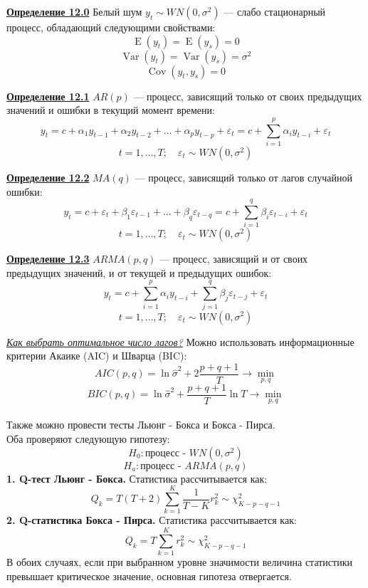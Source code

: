 \documentclass[a0,final]{a0poster}
\DeclareMathOperator{\Var}{Var}
\DeclareMathOperator{\Cov}{Cov}
\DeclareMathOperator{\E}{E}
\begin{document}
\begin{multicols}{4}
\begin{tcolorbox}[colback=green!5!white,colframe=green!75!black]
\textbf{\underline{Определение 12.0}} Белый шум $y_t \sim WN(0, \sigma^2)$ — слабо стационарный процесс, обладающий следующими свойствами:
\[\E(y_t)=\E(y_s)=0\]
\[\Var(y_t) = \Var(y_s) = \sigma^2 \]
\[\Cov(y_t,y_s) = 0\]
\end{tcolorbox}

\begin{tcolorbox}[colback=red!5!white,colframe=red!75!black]
\textbf{\underline{Определение 12.1}} $AR(p)$ — процесс, зависящий только от своих предыдущих значений и ошибки в текущий момент времени: \[y_t = c + \alpha_1y_{t-1} + \alpha_2y_{t-2}+ \ldots +\alpha_py_{t-p} + \varepsilon_t = c + \sum\limits_{i=1}^p \alpha_iy_{t-i} + \varepsilon_t\]
\[t=1, \ldots,T; \quad \varepsilon_t \sim WN(0, \sigma^2)\]
\end{tcolorbox}

\begin{tcolorbox}[colback=red!5!white,colframe=red!75!black]
\textbf{\underline{Определение 12.2}} $MA(q)$ — процесс, зависящий только от лагов случайной ошибки: \[y_t = c +  \varepsilon_t + \beta_1\varepsilon_{t-1}+ \ldots +\beta_q\varepsilon_{t-q}= c + \sum\limits_{i=1}^q \beta_i\varepsilon_{t-i} + \varepsilon_t\]
\[t=1, \ldots,T; \quad \varepsilon_t \sim WN(0, \sigma^2)\]
\end{tcolorbox}

\begin{tcolorbox}[colback=red!5!white,colframe=red!75!black]
\textbf{\underline{Определение 12.3}} $ARMA(p,q)$ — процесс, зависящий и от своих предыдущих значений, и от текущей и предыдущих ошибок: \[y_t = c +  \sum\limits_{i=1}^p \alpha_iy_{t-i} + \sum\limits_{j=1}^q \beta_j\varepsilon_{t-j} + \varepsilon_t\]
\[t=1, \ldots,T; \quad \varepsilon_t \sim WN(0, \sigma^2)\]
\end{tcolorbox}

\underline{\textit{Как выбрать оптимальное число лагов?}} Можно использовать информационные критерии Акаике (AIC) и Шварца (BIC):
\[AIC(p,q) = \ln\hat{\sigma}^2+2\frac{p+q+1}{T} \longrightarrow \min\limits_{p,q}\]
\[BIC(p,q) = \ln\hat{\sigma}^2 +\frac{p+q+1}{T}\ln T \longrightarrow \min\limits_{p,q}\]
\\
Также можно провести тесты Льюнг - Бокса и Бокса - Пирса.\\ Оба проверяют следующую гипотезу:
\[H_0: \text{процесс - } WN(0,\sigma^2)\]
\[H_a: \text{процесс - } ARMA(p,q) \]
\textbf{1. Q-тест Льюнг - Бокса.} Статистика рассчитывается как:
\[Q_k = T(T+2)\sum\limits_{k=1}^K \frac{1}{T-K}r^2_k \sim \chi^2_{K-p-q-1}\]
\textbf{2. Q-статистика Бокса - Пирса.} Статистика рассчитывается как:
\[Q_k = T\sum\limits_{k=1}^K r^2_k \sim \chi^2_{K-p-q-1}\]
В обоих случаях, если при выбранном уровне значимости величина статистики превышает критическое значение, основная гипотеза отвергается.\\



\end{multicols}
\end{document}

